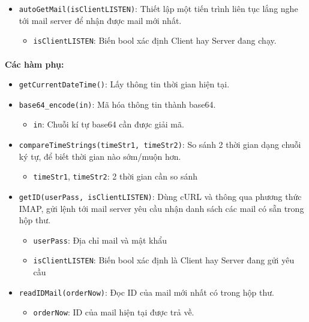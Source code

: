 \begin{itemize}
    \item \texttt{autoGetMail(isClientLISTEN)}: Thiết lập một tiến trình liên tục lắng nghe tới mail server để nhận được mail mới nhất.
        \begin{itemize}
            \item \texttt{isClientLISTEN}: Biến bool xác định Client hay Server đang chạy.
        \end{itemize}
        
\end{itemize}
    
\paragraph{}{\textbf{Các hàm phụ:}}

\begin{itemize}
    \item \texttt{getCurrentDateTime()}: Lấy thông tin thời gian hiện tại.
        
    \item \texttt{base64\_encode(in)}: Mã hóa thông tin thành base64.
    \begin{itemize}
        \item \texttt{in}: Chuỗi kí tự base64 cần được giải mã.
    \end{itemize}
        
    \item \texttt{compareTimeStrings(timeStr1, timeStr2)}: So sánh 2 thời gian dạng chuỗi ký tự, để biết thời gian nào sớm/muộn hơn.
    \begin{itemize}
        \item \texttt{timeStr1}, \texttt{timeStr2}: 2 thời gian cần so sánh
    \end{itemize}
        
    \item \texttt{getID(userPass, isClientLISTEN)}: Dùng cURL và thông qua phương thức IMAP, gửi lệnh tới mail server yêu cầu nhận danh sách các mail có sẵn trong hộp thư.
    \begin{itemize}
        \item \texttt{userPass}: Địa chỉ mail và mật khẩu
        \item \texttt{isClientLISTEN}: Biến bool xác định là Client hay Server đang gửi yêu cầu
    \end{itemize}
        
    \item \texttt{readIDMail(orderNow)}: Đọc ID của mail mới nhất có trong hộp thư.
    \begin{itemize}
        \item \texttt{orderNow}: ID của mail hiện tại được trả về.
    \end{itemize}
        

\end{itemize}
